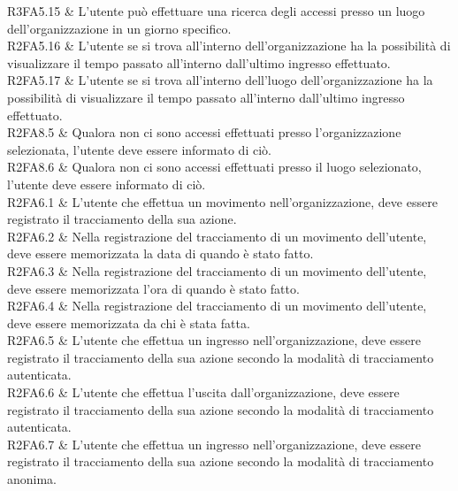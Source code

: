 R3FA5.15 & L’utente può effettuare una ricerca degli accessi presso un luogo dell’organizzazione  in un giorno specifico. \\

R2FA5.16 & L’utente se si trova all’interno dell’organizzazione ha la possibilità di visualizzare il tempo passato all’interno dall'ultimo ingresso effettuato. \\

R2FA5.17 & L’utente se si trova all’interno dell’luogo dell’organizzazione ha la possibilità di visualizzare il tempo passato all’interno dall'ultimo ingresso effettuato. \\

R2FA8.5 & Qualora non ci sono accessi effettuati presso l'organizzazione selezionata, l'utente deve essere informato di ciò.\\

R2FA8.6 & Qualora non ci sono accessi effettuati presso il luogo selezionato, l'utente deve essere informato di ciò. \\

R2FA6.1 & L’utente che effettua un movimento nell’organizzazione, deve essere registrato il tracciamento della sua azione. \\

R2FA6.2 & Nella registrazione del tracciamento di un movimento dell’utente, deve essere memorizzata la data di quando è stato fatto. \\

R2FA6.3 & Nella registrazione del tracciamento di un movimento dell’utente, deve essere memorizzata l’ora di quando è stato fatto. \\

R2FA6.4 & Nella registrazione del tracciamento di un movimento dell’utente, deve essere memorizzata da chi è stata fatta. \\

R2FA6.5 & L’utente che effettua un ingresso nell’organizzazione, deve essere registrato il tracciamento della sua azione secondo la modalità di tracciamento autenticata. \\

R2FA6.6 & L’utente che effettua l’uscita dall’organizzazione, deve essere registrato il tracciamento della sua azione secondo la modalità di tracciamento autenticata. \\

R2FA6.7 & L’utente che effettua un ingresso nell’organizzazione, deve essere registrato il tracciamento della sua azione secondo la modalità di tracciamento anonima. \\

